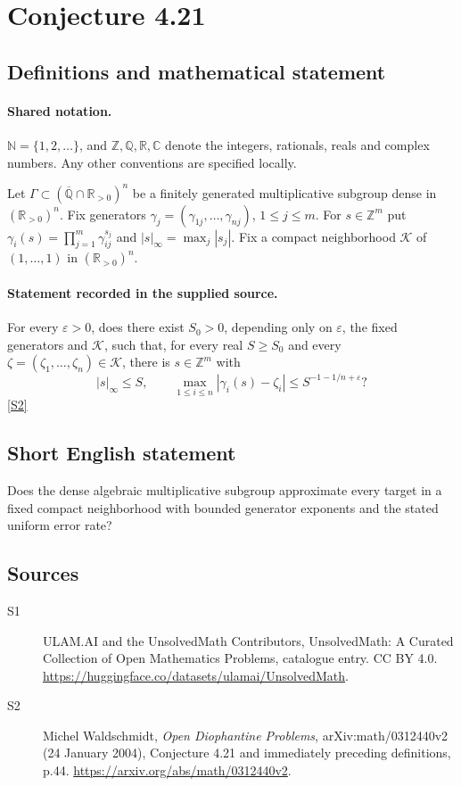 \documentclass[11pt]{article}
\newcommand{\sref}[2]{\hyperlink{source:#1:#2}{[S#2]}}
\begin{document}
\section{Conjecture 4.21}\label{statement}

\subsection{Definitions and mathematical statement}

\paragraph{Shared notation.}$\mathbb N=\{1,2,\ldots\}$, and $\mathbb Z,\mathbb Q,\mathbb R,\mathbb C$ denote the integers, rationals, reals and complex numbers. Any other conventions are specified locally.


Let $\Gamma\subset(\overline{\mathbb Q}\cap\mathbb R_{>0})^n$ be a finitely generated multiplicative subgroup dense in $(\mathbb R_{>0})^n$. Fix generators $\gamma_j=(\gamma_{1j},\ldots,\gamma_{nj})$, $1\le j\le m$. For $s\in\mathbb Z^m$ put $\gamma_i(s)=\prod_{j=1}^m\gamma_{ij}^{s_j}$ and $|s|_\infty=\max_j|s_j|$. Fix a compact neighborhood $\mathcal K$ of $(1,\ldots,1)$ in $(\mathbb R_{>0})^n$.
\paragraph{Statement recorded in the supplied source.}
For every $\varepsilon>0$, does there exist $S_0>0$, depending only on $\varepsilon$, the fixed generators and $\mathcal K$, such that, for every real $S\ge S_0$ and every $\zeta=(\zeta_1,\ldots,\zeta_n)\in\mathcal K$, there is $s\in\mathbb Z^m$ with
\[
|s|_\infty\le S,\qquad \max_{1\le i\le n}|\gamma_i(s)-\zeta_i|\le S^{-1-1/n+\varepsilon}?
\] \sref{statement}{2}

\subsection{Short English statement}
Does the dense algebraic multiplicative subgroup approximate every target in a fixed compact neighborhood with bounded generator exponents and the stated uniform error rate?
\subsection{Sources}
\begin{description}
\item[\hypertarget{source:statement:1}{S1}] ULAM.AI and the UnsolvedMath Contributors, UnsolvedMath: A Curated Collection of Open Mathematics Problems, catalogue entry. CC BY 4.0. \url{https://huggingface.co/datasets/ulamai/UnsolvedMath}.
\item[\hypertarget{source:statement:2}{S2}] Michel Waldschmidt, \emph{Open Diophantine Problems}, arXiv:math/0312440v2 (24 January 2004), Conjecture 4.21 and immediately preceding definitions, p.44. \url{https://arxiv.org/abs/math/0312440v2}.
\end{description}
\label{end:statement}
\end{document}

